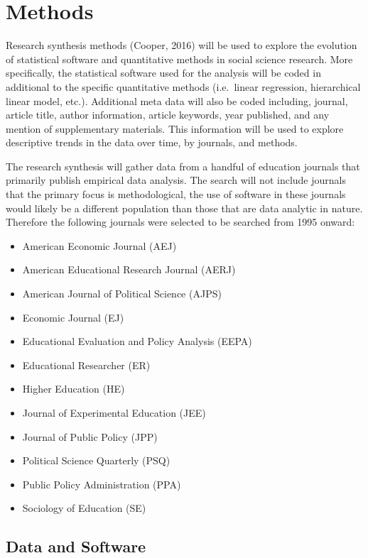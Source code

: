 \documentclass[english,,man]{apa6}
\providecommand{\tightlist}{%
  \setlength{\itemsep}{0pt}\setlength{\parskip}{0pt}}
\begin{document}
\hypertarget{methods}{%
\section{Methods}\label{methods}}

Research synthesis methods (Cooper, 2016) will be used to explore the evolution of statistical software and quantitative methods in social science research. More specifically, the statistical software used for the analysis will be coded in additional to the specific quantitative methods (i.e.~linear regression, hierarchical linear model, etc.). Additional meta data will also be coded including, journal, article title, author information, article keywords, year published, and any mention of supplementary materials. This information will be used to explore descriptive trends in the data over time, by journals, and methods.

The research synthesis will gather data from a handful of education journals that primarily publish empirical data analysis. The search will not include journals that the primary focus is methodological, the use of software in these journals would likely be a different population than those that are data analytic in nature. Therefore the following journals were selected to be searched from 1995 onward:

\begin{itemize}
\tightlist
\item
  American Economic Journal (AEJ)
\item
  American Educational Research Journal (AERJ)
\item
  American Journal of Political Science (AJPS)
\item
  Economic Journal (EJ)
\item
  Educational Evaluation and Policy Analysis (EEPA)
\item
  Educational Researcher (ER)
\item
  Higher Education (HE)
\item
  Journal of Experimental Education (JEE)
\item
  Journal of Public Policy (JPP)
\item
  Political Science Quarterly (PSQ)
\item
  Public Policy Administration (PPA)
\item
  Sociology of Education (SE)
\end{itemize}

\hypertarget{data-and-software}{%
\subsection{Data and Software}\label{data-and-software}}
\end{document}
